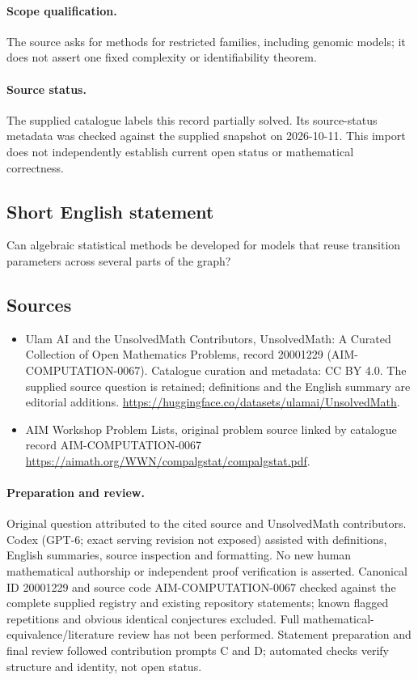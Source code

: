 \documentclass[11pt]{article}
\begin{document}
\paragraph{Scope qualification.}
The source asks for methods for restricted families, including genomic models; it does not assert one fixed complexity or identifiability theorem.
\paragraph{Source status.}
The supplied catalogue labels this record partially solved. Its source-status metadata was checked against the supplied snapshot on 2026-10-11. This import does not independently establish current open status or mathematical correctness.
\subsection{Short English statement}
Can algebraic statistical methods be developed for models that reuse transition parameters across several parts of the graph?
\subsection{Sources}
\begin{itemize}
\item[S1] Ulam AI and the UnsolvedMath Contributors, UnsolvedMath: A Curated Collection of Open Mathematics Problems, record 20001229 (AIM-COMPUTATION-0067). Catalogue curation and metadata: CC BY 4.0. The supplied source question is retained; definitions and the English summary are editorial additions.
\url{https://huggingface.co/datasets/ulamai/UnsolvedMath}.
\item[S2] AIM Workshop Problem Lists, original problem source linked by catalogue record AIM-COMPUTATION-0067
\url{https://aimath.org/WWN/compalgstat/compalgstat.pdf}.
\end{itemize}
\paragraph{Preparation and review.}
Original question attributed to the cited source and UnsolvedMath contributors. Codex (GPT-6; exact serving revision not exposed) assisted with definitions, English summaries, source inspection and formatting. No new human mathematical authorship or independent proof verification is asserted. Canonical ID 20001229 and source code AIM-COMPUTATION-0067 checked against the complete supplied registry and existing repository statements; known flagged repetitions and obvious identical conjectures excluded. Full mathematical-equivalence/literature review has not been performed. Statement preparation and final review followed contribution prompts C and D; automated checks verify structure and identity, not open status.
\label{end:20001229}
\end{document}
